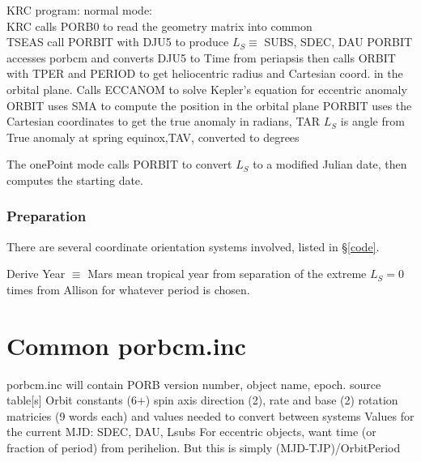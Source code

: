 \documentclass[draft]{article}
\begin{document}
KRC program: normal mode:
\\ KRC calls PORB0 to read the geometry matrix into common
\\ TSEAS call PORBIT with DJU5 to produce $L_S \equiv $ SUBS, SDEC, DAU
\qi PORBIT accesses porbcm and converts DJU5 to Time from periapsis  
\qii then calls ORBIT with TPER and PERIOD to get heliocentric radius and Cartesian coord. in the orbital plane. 
\qiii Calls ECCANOM to solve Kepler's equation for eccentric anomaly
\qii  ORBIT uses SMA to compute the position in the orbital plane
\qi PORBIT uses the Cartesian coordinates to get the true anomaly in radians, TAR
\qii $L_S$ is angle from True anomaly at spring equinox,TAV, converted to degrees

The onePoint mode calls PORBIT to convert $L_S$ to a modified Julian date, then computes the starting date.

\subsubsection{Preparation }
There are several coordinate orientation systems involved, listed in \S \ref{code}. 

Derive Year $\equiv$ Mars mean tropical year from
separation of the extreme $L_S=0$ times from Allison for whatever period is
chosen.

\section{Common porbcm.inc \label{pcom}}  %

porbcm.inc will contain
\qi PORB version number, object name, epoch. source table[s]
\qi Orbit constants (6+) spin axis direction (2), rate and base (2)
\qi rotation matricies (9 words each) and values needed to convert between systems
\qi Values for the current MJD: SDEC, DAU, Lsubs
\qi For eccentric objects, want time (or fraction of period) from perihelion.
\qii But this is simply (MJD-TJP)/OrbitPeriod
\end{document}
